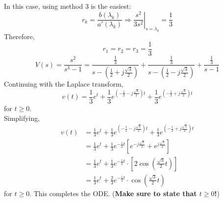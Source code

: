\documentclass[10pt]{article}
\begin{document}
In this case, using method 3 is the easiest:
\[r_k = \frac{b(\lambda_k)}{a'(\lambda_k)} \Rightarrow \left.\frac{s^2}{3s^2}\right|_{s=\lambda_k} = \frac{1}{3}\]
Therefore,
\[r_1 = r_2 = r_3 = \frac{1}{3}\]
\[V(s) = \frac{s^2}{s^3 - 1} = \frac{\frac{1}{3}}{s - (\frac{1}{2} + j\frac{\sqrt{3}}{2})} + \frac{\frac{1}{3}}{s - (\frac{1}{2} - j\frac{\sqrt{3}}{2})} + \frac{\frac{1}{3}}{s - 1}\]
Continuing with the Laplace transform,
\[v(t) = \frac{1}{3}e^t + \frac{1}{3}e^{(-\frac{1}{2} - j\frac{\sqrt{3}}{2})t} + \frac{1}{3}e^{(-\frac{1}{2} + j\frac{\sqrt{3}}{2})t}\]
    for $t \geq 0$.\\
Simplifying,
\begin{align*}
    v(t) &= \frac{1}{3}e^t + \frac{1}{3}e^{(-\frac{1}{2} - j\frac{\sqrt{3}}{2})t} + \frac{1}{3}e^{(-\frac{1}{2} + j\frac{\sqrt{3}}{2})t}\\
    &= \frac{1}{3}e^t + \frac{1}{3}e^{-\frac{1}{2}t}\left[e^{-j\frac{\sqrt{3}}{2}} + e^{j\frac{\sqrt{3}}{2}}\right]\\
    &= \frac{1}{3}e^t + \frac{1}{3}e^{-\frac{1}{2}t} \cdot \left[2\cos\left(\frac{\sqrt{3}}{2} t\right)\right]\\
    &= \frac{1}{3}e^t + \frac{2}{3} e^{-\frac{1}{2}t} \cdot \cos\left(\frac{\sqrt{3}}{2} t\right)
\end{align*}
for $t \geq 0$.  This completes the ODE.  (\textbf{Make sure to state that $t \geq 0$!})
\end{document}
